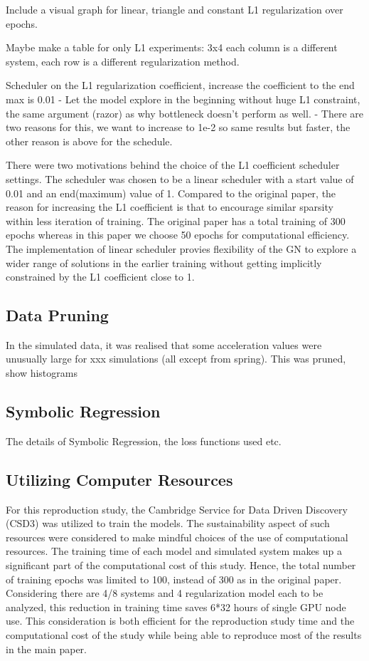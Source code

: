 \documentclass{article}
\begin{document}
Include a visual graph for linear, triangle and constant L1 regularization over epochs.

Maybe make a table for only L1 experiments: 3x4 each column is a different system, each row is a different regularization method.


Scheduler on the L1 regularization coefficient, increase the coefficient to the end max is 0.01
- Let the model explore in the beginning without huge L1 constraint, the same argument (razor) as why bottleneck doesn’t perform as well.
- There are two reasons for this, we want to increase to 1e-2 so same results but faster, the other reason is above for the schedule.

There were two motivations behind the choice of the L1 coefficient scheduler settings. The scheduler was chosen to be a linear scheduler with a start value of 0.01 and an end(maximum) value of 1. Compared to the original paper, the reason for increasing the L1 coefficient is that to encourage similar sparsity within less iteration of training. The original paper has a total training of 300 epochs whereas in this paper we choose 50 epochs for computational efficiency. The implementation of linear scheduler provies flexibility of the GN to explore a wider range of solutions in the earlier training without getting implicitly constrained by the L1 coefficient close to 1.

\subsection{Data Pruning}

In the simulated data, it was realised that some acceleration values were unusually large for xxx simulations (all except from spring). This was pruned, show histograms

\subsection{Symbolic Regression}
The details of Symbolic Regression, the loss functions used etc.

\subsection{Utilizing Computer Resources}
For this reproduction study, the Cambridge Service for Data Driven Discovery (CSD3) was utilized to train the models. The sustainability aspect of such resources were considered to make mindful choices of the use of computational resources. The training time of each model and simulated system makes up a significant part of the computational cost of this study. Hence, the total number of training epochs was limited to 100, instead of 300 as in the original paper. Considering there are 4/8 systems and 4 regularization model each to be analyzed, this reduction in training time saves 6*32 hours of single GPU node use. This consideration is both efficient for the reproduction study time and the computational cost of the study while being able to reproduce most of the results in the main paper.
\end{document}
